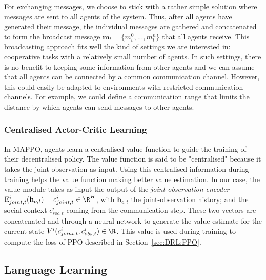 For exchanging messages, we choose to stick with a rather simple solution where messages are sent to all agents of the system. Thus, after all agents have generated their message, the individual messages are gathered and concatenated to form the broadcast message $\mathbf{m}_t=\{m_t^0,...,m_t^n\}$ that all agents receive. 
This broadcasting approach fits well the kind of settings we are interested in: cooperative tasks with a relatively small number of agents. In such settings, there is no benefit to keeping some information from other agents and we can assume that all agents can be connected by a common communication channel. However, this could easily be adapted to environments with restricted communication channels. For example, we could define a communication range that limits the distance by which agents can send messages to other agents. 


\subsubsection{Centralised Actor-Critic Learning}

In MAPPO, agents learn a centralised value function to guide the training of their decentralised policy. The value function is said to be "centralised" because it takes the joint-observation as input. Using this centralised information during training helps the value function making better value estimation. In our case, the value module takes as input the output of the \textit{joint-observation encoder} $\mathrm{E}^i_{joint,t}(\mathbf{h}_{o,t})=c^i_{joint,t}\in\R^H$, with $\mathbf{h}_{o,t}$ the joint-observation history; and the social context $c_{soc,t}^i$ coming from the communication step. These two vectors are concatenated and through a neural network to generate the value estimate for the current state $V^i(c^i_{joint,t},c^i_{obs,t})\in\R$. This value is used during training to compute the loss of PPO described in Section~\ref{sec:DRL:PPO}. 



\subsection{Language Learning}\label{sec:LAMAC:LangLearning}


